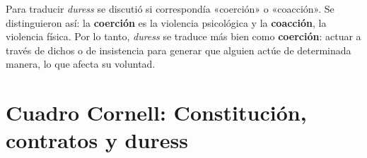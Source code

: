 \documentclass[12pt,oneside]{book}
\begin{document}
Para traducir \textit{duress} se discutió si correspondía «coerción» o «coacción». Se distinguieron así: la \textbf{coerción} es la violencia psicológica y la \textbf{coacción}, la violencia física. Por lo tanto, \textit{duress} se traduce más bien como \textbf{coerción}: actuar a través de dichos o de insistencia para generar que alguien actúe de determinada manera, lo que afecta su voluntad.


\section{Cuadro Cornell: Constitución, contratos y duress}
\end{document}
